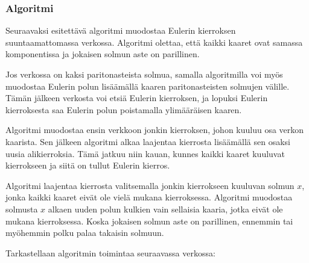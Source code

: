\subsubsection{Algoritmi}

Seuraavaksi esitettävä algoritmi muodostaa Eulerin kierroksen
suuntaamattomassa verkossa.
Algoritmi olettaa, että kaikki kaaret ovat samassa
komponentissa ja jokaisen solmun aste on parillinen.

Jos verkossa on kaksi paritonasteista solmua,
samalla algoritmilla voi myös muodostaa
Eulerin polun lisäämällä kaaren
paritonasteisten solmujen välille.
Tämän jälkeen verkosta voi etsiä Eulerin kierroksen,
ja lopuksi Eulerin kierroksesta saa Eulerin polun
poistamalla ylimääräisen kaaren.

Algoritmi muodostaa ensin verkkoon jonkin kierroksen,
johon kuuluu osa verkon kaarista.
Sen jälkeen algoritmi alkaa laajentaa kierrosta
lisäämällä sen osaksi uusia alikierroksia.
Tämä jatkuu niin kauan, kunnes kaikki kaaret kuuluvat
kierrokseen ja siitä on tullut Eulerin kierros.

Algoritmi laajentaa kierrosta valitsemalla jonkin
kierrokseen kuuluvan solmun $x$,
jonka kaikki kaaret eivät ole vielä mukana kierroksessa.
Algoritmi muodostaa solmusta $x$ alkaen uuden polun
kulkien vain sellaisia kaaria, jotka eivät ole
mukana kierroksessa.
Koska jokaisen solmun aste on parillinen,
ennemmin tai myöhemmin polku palaa takaisin solmuun.

\begin{samepage}
Tarkastellaan algoritmin toimintaa seuraavassa verkossa:
\begin{center}
\end{center}
\end{samepage}

